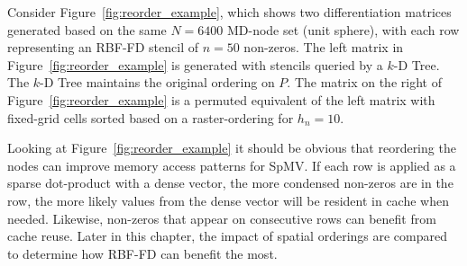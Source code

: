 \documentclass{report}
\begin{document}
Consider Figure~\ref{fig:reorder_example}, which shows two differentiation matrices generated based on the same $N=6400$ MD-node set (unit sphere), with each row representing an RBF-FD stencil of $n=50$ non-zeros. The left matrix in Figure~\ref{fig:reorder_example} is generated with stencils queried by a $k$-D Tree. The $k$-D Tree maintains the original ordering on $P$. The matrix on the right of Figure~\ref{fig:reorder_example} is a permuted equivalent of the left matrix with fixed-grid cells sorted based on a raster-ordering for $h_n = 10$. 

Looking at Figure~\ref{fig:reorder_example} it should be obvious that reordering the nodes can improve memory access patterns for SpMV. If each row is applied as a sparse dot-product with a dense vector, the more condensed non-zeros are in the row, the more likely values from the dense vector will be resident in cache when needed. Likewise, non-zeros that appear on consecutive rows can benefit from cache reuse. Later in this chapter, the impact of spatial orderings are compared to determine how RBF-FD can benefit the most. 
\end{document}
